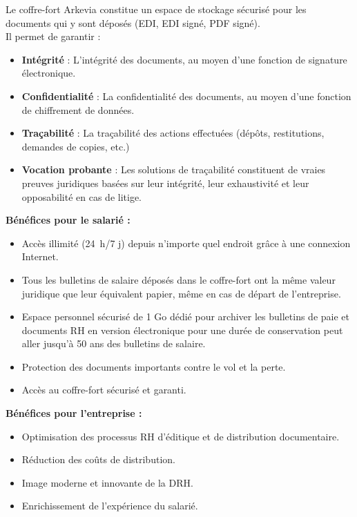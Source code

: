 Le coffre-fort Arkevia constitue un espace de stockage sécurisé pour les documents qui y sont déposés (EDI, EDI signé, PDF signé).\\
Il permet de garantir :
\begin{itemize}
    \item \textbf{Intégrité} : L'intégrité des documents, au moyen d’une fonction de signature électronique.
    \item \textbf{Confidentialité} : La confidentialité des documents, au moyen d’une fonction de chiffrement de données.
    \item \textbf{Traçabilité} : La traçabilité des actions effectuées (dépôts, restitutions, demandes de copies, etc.)
    \item \textbf{Vocation probante} : Les solutions de traçabilité constituent de vraies preuves juridiques basées sur leur intégrité, leur exhaustivité et leur opposabilité en cas de litige.\\
\end{itemize}
\newpage
\noindent
\textbf{Bénéfices pour le salarié :}
\begin{itemize}
    \item Accès illimité (24 h/7 j) depuis n’importe quel endroit grâce à une connexion Internet.
    \item Tous les bulletins de salaire déposés dans le coffre-fort ont la même valeur juridique que leur équivalent papier, même en cas de départ de l’entreprise.
    \item Espace personnel sécurisé de 1 Go dédié pour archiver les bulletins de paie et documents RH en version électronique pour une durée de conservation peut aller jusqu'à 50 ans des bulletins de salaire.
    \item Protection des documents importants contre le vol et la perte.
    \item Accès au coffre-fort sécurisé et garanti.\\
\end{itemize}

\noindent
\textbf{Bénéfices pour l’entreprise :}
\begin{itemize}
    \item Optimisation des processus RH d’éditique et de distribution documentaire.
    \item Réduction des coûts de distribution.
    \item Image moderne et innovante de la DRH.
    \item Enrichissement de l’expérience du salarié.
\end{itemize}
